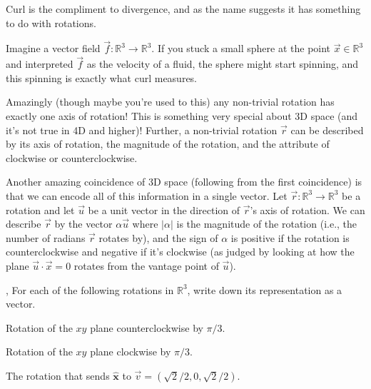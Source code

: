 \documentclass[letter]{article}
\newcommand{\xh}{{\hat {\mathbf x}}}
\newcommand{\R}{\mathbb{R}}
\renewcommand{\emph}[1]{{\color{defcolor} \textbf{\textit{##1}}}}
\begin{document}
\vspace{-.3cm}
	Curl is the compliment to divergence, and as the name suggests it has something to do
	with rotations.

	Imagine a vector field $\vec f:\R^3\to\R^3$.  If you stuck a small sphere at the point
	$\vec x\in\R^3$ and interpreted $\vec f$ as the velocity of a fluid, the sphere might
	start spinning, and this spinning is exactly what curl measures.  

	\vspace{-.6cm}

	Amazingly (though maybe you're used to this) any non-trivial rotation has exactly one axis of rotation!
	This is something very special about 3D space (and it's not true in 4D and higher)!  
	Further, a non-trivial rotation $\vec r$ can be described
	by its axis of rotation, the magnitude of the rotation, and the attribute of clockwise or counterclockwise.

	Another amazing coincidence of 3D space (following from the first coincidence) 
	is that we can encode all of this information in a single vector.
	Let $\vec r:\R^3\to \R^3$ be a rotation and let $\vec u$ be a unit vector in the direction of $\vec r$'s 
	axis of rotation.  We can describe $\vec r$ by the vector $\alpha \vec u$ where $|\alpha|$ is the magnitude
	of the rotation (i.e., the number of radians $\vec r$ rotates by), and the sign of $\alpha$ is positive
	if the rotation is counterclockwise and negative if it's clockwise (as judged by looking at
	how the plane $\vec u\cdot \vec x=0$ rotates from the vantage point of $\vec u$).

	\sep
	For each of the following rotations in $\R^3$, write down its representation as a vector.
	\vspace{-.3cm}
	\begin{Enum}
		\item Rotation of the $xy$ plane counterclockwise by $\pi/3$.
		\item Rotation of the $xy$ plane clockwise by $\pi/3$.
		\item The rotation that sends $\xh$ to $\vec v=(\sqrt{2}/2, 0, \sqrt{2}/2)$.
	\end{Enum}
\end{document}
